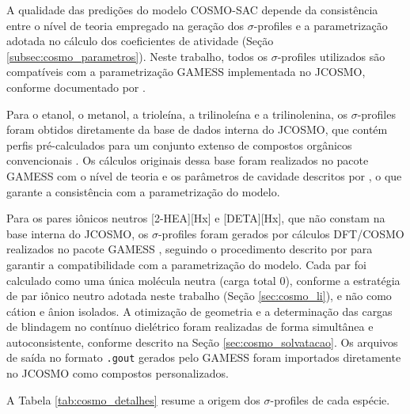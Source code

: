 A qualidade das predições do modelo COSMO-SAC depende da consistência entre o nível de teoria empregado na geração dos $\sigma$-profiles e a parametrização adotada no cálculo dos coeficientes de atividade (Seção \ref{subsec:cosmo_parametros}). Neste trabalho, todos os $\sigma$-profiles utilizados são compatíveis com a parametrização GAMESS implementada no JCOSMO, conforme documentado por .

Para o etanol, o metanol, a trioleína, a trilinoleína e a trilinolenina, os $\sigma$-profiles foram obtidos diretamente da base de dados interna do JCOSMO, que contém perfis pré-calculados para um conjunto extenso de compostos orgânicos convencionais \cite{mullins2006}. Os cálculos originais dessa base foram realizados no pacote GAMESS \cite{gamess2020} com o nível de teoria e os parâmetros de cavidade descritos por , o que garante a consistência com a parametrização do modelo.

Para os pares iônicos neutros [2-HEA][Hx] e [DETA][Hx], que não constam na base interna do JCOSMO, os $\sigma$-profiles foram gerados por cálculos DFT/COSMO realizados no pacote GAMESS \cite{gamess2020}, seguindo o procedimento descrito por  para garantir a compatibilidade com a parametrização do modelo. Cada par foi calculado como uma única molécula neutra (carga total 0), conforme a estratégia de par iônico neutro adotada neste trabalho (Seção \ref{sec:cosmo_li}), e não como cátion e ânion isolados. A otimização de geometria e a determinação das cargas de blindagem no contínuo dielétrico foram realizadas de forma simultânea e autoconsistente, conforme descrito na Seção \ref{sec:cosmo_solvatacao}. Os arquivos de saída no formato \texttt{.gout} gerados pelo GAMESS foram importados diretamente no JCOSMO como compostos personalizados.

A Tabela \ref{tab:cosmo_detalhes} resume a origem dos
$\sigma$-profiles de cada espécie.

